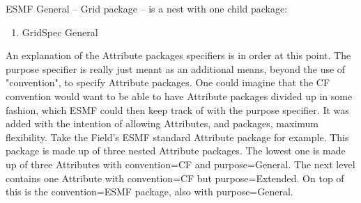 ESMF General -- Grid package -- is a nest with one child package:
\begin{enumerate}
   \item GridSpec General
\end{enumerate}

An explanation of the Attribute packages specifiers is in order at this point.  The purpose specifier is really just meant as an additional means, beyond the use of "convention", to specify Attribute packages.  One could imagine that the CF convention would want to be able to have Attribute packages divided up in some fashion, which ESMF could then keep track of with the purpose specifier.  It was added with the intention of allowing Attributes, and packages, maximum flexibility.  Take the Field's ESMF standard Attribute package for example.  This package is made up of three nested Attribute packages.  The lowest one is made up of three Attributes with convention=CF and purpose=General.  The next level contains one Attribute with convention=CF but purpose=Extended.  On top of this is the convention=ESMF package, also with purpose=General.
